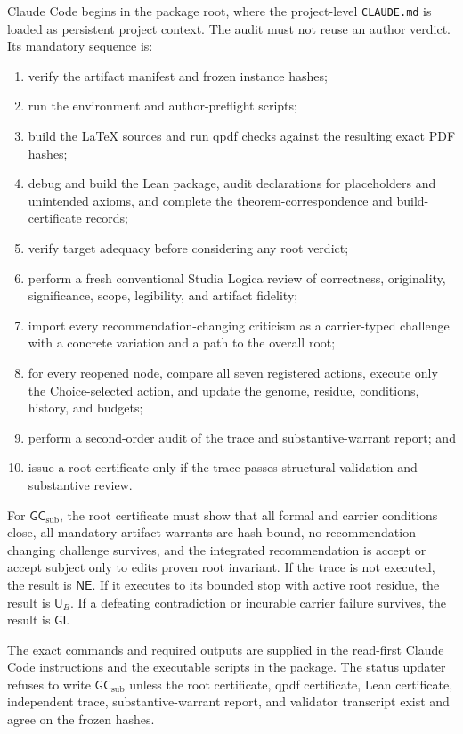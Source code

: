 \documentclass[10pt]{article}
\newcommand{\GI}{\mathsf{GI}}
\newcommand{\UB}{\mathsf{U}_B}
\newcommand{\NE}{\mathsf{NE}}
\newcommand{\GCsub}{\mathsf{GC}_{\mathrm{sub}}}
\begin{document}
Claude Code begins in the package root, where the project-level \texttt{CLAUDE.md} is loaded as persistent project context.  The audit must not reuse an author verdict.  Its mandatory sequence is:
\begin{enumerate}
  \item verify the artifact manifest and frozen instance hashes;
  \item run the environment and author-preflight scripts;
  \item build the LaTeX sources and run qpdf checks against the resulting exact PDF hashes;
  \item debug and build the Lean package, audit declarations for placeholders and unintended axioms, and complete the theorem-correspondence and build-certificate records;
  \item verify target adequacy before considering any root verdict;
  \item perform a fresh conventional Studia Logica review of correctness, originality, significance, scope, legibility, and artifact fidelity;
  \item import every recommendation-changing criticism as a carrier-typed challenge with a concrete variation and a path to the overall root;
  \item for every reopened node, compare all seven registered actions, execute only the Choice-selected action, and update the genome, residue, conditions, history, and budgets;
  \item perform a second-order audit of the trace and substantive-warrant report; and
  \item issue a root certificate only if the trace passes structural validation and substantive review.
\end{enumerate}

For $\GCsub$, the root certificate must show that all formal and carrier conditions close, all mandatory artifact warrants are hash bound, no recommendation-changing challenge survives, and the integrated recommendation is accept or accept subject only to edits proven root invariant.  If the trace is not executed, the result is $\NE$.  If it executes to its bounded stop with active root residue, the result is $\UB$.  If a defeating contradiction or incurable carrier failure survives, the result is $\GI$.

The exact commands and required outputs are supplied in the read-first Claude Code instructions and the executable scripts in the package.  The status updater refuses to write $\GCsub$ unless the root certificate, qpdf certificate, Lean certificate, independent trace, substantive-warrant report, and validator transcript exist and agree on the frozen hashes.
\end{document}
